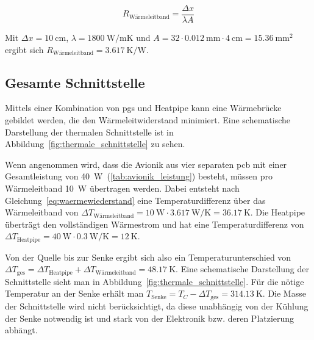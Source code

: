 \begin{equation*}
  R_\mathrm{Wärmeleitband} = \frac{\Delta x}{\lambda A}
\end{equation*}

Mit $\Delta x = \SI{10}{\centi\meter}$, $\lambda = \SI{1800}{\watt\per\meter\kelvin}$ und $A = 32 \cdot \SI{0,012}{\milli\meter} \cdot \SI{4}{\centi\meter} = \SI{15,36}{\milli\meter\squared}$
ergibt sich $R_\mathrm{Wärmeleitband} = \SI{3,617}{\kelvin\per\watt}$.

\subsection{Gesamte Schnittstelle}\label{sec:gesamte_schnittstelle}

Mittels einer Kombination von \ac{pgs} und Heatpipe kann eine Wärmebrücke gebildet werden, die den Wärmeleitwiderstand
minimiert. Eine schematische Darstellung der thermalen Schnittstelle ist in Abbildung~\ref{fig:thermale_schnittstelle} zu sehen.

Wenn angenommen wird, dass die Avionik aus vier separaten \ac{pcb} mit einer Gesamtleistung von \SI{40}{\watt}~(\ref{tab:avionik_leistung}) besteht, müssen pro Wärmeleitband \SI{10}{\watt} übertragen werden.
Dabei entsteht nach Gleichung~\ref{eq:waermewiederstand} eine Temperaturdifferenz über das Wärmeleitband von $\Delta T_\mathrm{Wärmeleitband} = \SI{10}{\watt} \cdot \SI{3,617}{\watt\per\kelvin} = \SI{36,17}{\kelvin}$.
Die Heatpipe überträgt den vollständigen Wärmestrom und hat eine Temperaturdifferenz von $\Delta T_\mathrm{Heatpipe} = \SI{40}{\watt} \cdot \SI{0,3}{\watt\per\kelvin} = \SI{12}{\kelvin}$.

Von der Quelle bis zur Senke ergibt sich also ein Temperaturunterschied von $\Delta T_\mathrm{ges} = \Delta T_\mathrm{Heatpipe} + \Delta T_\mathrm{Wärmeleitband} = \SI{48,17}{\kelvin}$.
Eine schematische Darstellung der Schnittstelle sieht man in Abbildung~\ref{fig:thermale_schnittstelle}. Für die nötige Temperatur an der Senke
erhält man $T_\mathrm{Senke} = T_C - \Delta T_\mathrm{ges} = \SI{314,13}{\kelvin}$. Die Masse der Schnittstelle wird nicht berücksichtigt, da diese
unabhängig von der Kühlung der Senke notwendig ist und stark von der Elektronik bzw. deren Platzierung abhängt.

